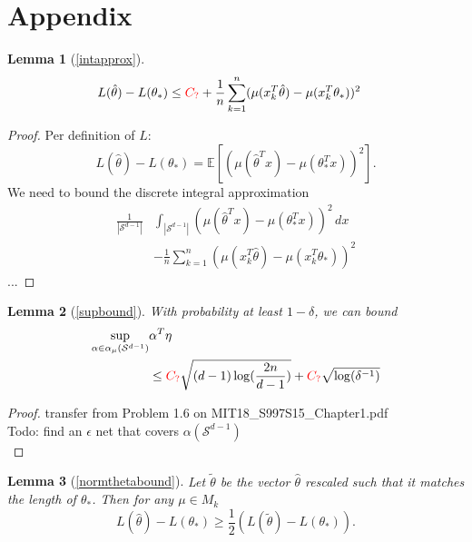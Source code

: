 \documentclass[twoside]{article} \usepackage{aistats2017}
\newcommand{\EV}[1] {
  \mathbb{E}\left[#1\right]}
\newtheorem*{lemma*}{Lemma}
\newcommand{\uc}{
\color{red}C_?\color{black}
}
\begin{document}
\section{Appendix}
\begin{lemma*}[\ref{intapprox}]
\begin{align*}
&L(\hat{\theta})-L(\theta_*) \leq\uc + \frac{1}{n}\sum_{k=1}^n(\mu(x_k^T\hat{\theta})-\mu(x_k^T\theta_*))^2
\end{align*}
\end{lemma*}
\begin{proof}
Per definition of $L$:
$$L(\hat{\theta})-L(\theta_*) = \EV{(\mu(\hat{\theta}^Tx)-\mu(\theta_*^Tx))^2}.$$
We need to bound the discrete integral approximation
\begin{align*}
    \frac{1}{|\mathcal{S}^{d-1}|}&\int_{|\mathcal{S}^{d-1}|}(\mu(\hat{\theta}^Tx)-\mu(\theta_*^Tx))^2\,dx\\
    &-\frac{1}{n}\sum_{k=1}^n(\mu(x_k^T\hat{\theta})-\mu(x_k^T\theta_*))^2
\end{align*}
...
\end{proof}
\begin{lemma*}[\ref{supbound}]
    With probability at least $1-\delta$, we can bound
    \begin{align*}
    \sup_{\alpha\in\alpha_\mu(\mathcal{S}^{d-1})}&\alpha^T\eta\\
    &\leq \uc\sqrt{(d-1)\log(\frac{2n}{d-1})}+\uc\sqrt{\log(\delta^{-1})}
    \end{align*}
\end{lemma*}
\begin{proof}
transfer from Problem 1.6 on MIT18\_S997S15\_Chapter1.pdf\\
\color{red}Todo: find an $\epsilon$ net that covers $\alpha(\mathcal{S}^{d-1})$\color{black}\
\\
\end{proof}
\begin{lemma*}[\ref{normthetabound}]
    Let $\tilde{\theta}$ be the vector $\hat{\theta}$ rescaled such that it matches the length of $\theta_*$. Then for any $\mu\in M_k$
    $$L(\hat{\theta})-L(\theta_*) \geq \frac{1}{2}(L(\tilde{\theta})-L(\theta_*)).$$
\end{lemma*}
\end{document}
